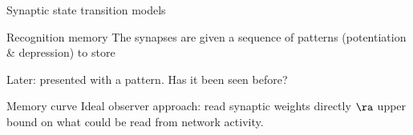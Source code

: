 \documentclass[final,hyperref={pdfpagelabels=false,bookmarks=false}]{beamer}
\begin{document}
\begin{frame}{}
\begin{columns}[t]
\begin{column}{0.33\linewidth}
\begin{block}{Synaptic state transition models}
%
\end{block}



\begin{block}{Recognition memory}
%
 The synapses are given a sequence of patterns (potentiation \& depression) to store

 \vp
 \begin{center}
 \begin{inlineenumerate}
 \item {}
 \hspace{0.03\linewidth}
 \item {}
 \hspace{0.03\linewidth}
 \item {}
 \hspace{0.03\linewidth}
 \item {}
 \end{inlineenumerate}
 \end{center}

 \vp Later: presented with a pattern.
 Has it been seen before?
%
\end{block}


\begin{block}{Memory curve}
%
 Ideal observer approach: read synaptic weights directly
 $\ra$ upper bound on what could be read from network activity.


\end{block}
\end{column}
\end{columns}
\end{frame}
\end{document}
